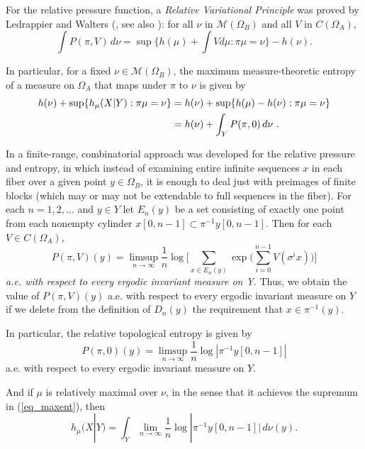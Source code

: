 \documentclass{kepart2010}
\theoremstyle{plain}
\theoremstyle{definition}
\theoremstyle{remark}
\theoremstyle{definition}
\numberwithin{equation}{section}
\begin{document}
For the relative pressure function, a {\em Relative Variational
Principle} was proved by Ledrappier and Walters
(\cite{LedrappierWalters1977}, see also
\cite{DownarowiczSerafin2002}):
 for all
$\nu$ in ${{\mathcal M}}(\Omega_B)$ and all $V$ in $C(\Omega_A)$,
 \begin{equation}
 \int\!P(\pi, V) \, d \nu = \sup\limits \Big\{ h(\mu) + \int\!V d
\mu : \pi\mu =\nu \Big\} - h(\nu). \end{equation}

In particular, for a fixed $\nu \in {{\mathcal M}}(\Omega_B)$, the maximum
measure-theoretic entropy of a measure on $\Omega_A$ that maps under
$\pi$ to $\nu$ is given by
\begin{align}\label{eq_maxent}
h(\nu ) + \sup \{h_{\mu}(X|Y) :\pi\mu =\nu\}
&= h(\nu ) +\sup \{h(\mu)- h(\nu): \pi\mu =\nu\} \\
\notag  &= h(\nu ) +\int_Y P(\pi ,0)\,  d \nu \ .
\end{align}

In \cite{PetersenShin2005} a finite-range, combinatorial approach
was developed for the relative pressure and entropy, in which
instead of examining entire infinite sequences $x$ in each fiber
over a given point $y \in \Omega_B$, it is enough to deal just with
preimages of finite blocks (which may or may not be extendable to
full sequences in the fiber). For each $n = 1, 2, \dots$ and $y \in
Y$ let $E_n (y)$ be a set consisting of exactly one point from each
nonempty cylinder $x[0,n-1] \subset \pi^{-1} y[0,n-1]$.
\medskip
Then for each $V \in C(\Omega_A)$,
 \begin{equation} P(\pi,V) (y) = \limsup_{n
 \rightarrow \infty} \frac{1}{n} \log \bigg[ \sum_{x \in E_n (y)}
 \exp \Big( \sum_{i=0}^{n-1} V (\sigma^i x) \Big) \bigg]
 \end{equation}
 {\em a.e. with respect to every
ergodic invariant measure on Y}. Thus, we obtain the
value of $P(\pi,V) (y)$ a.e. with respect to every
ergodic invariant measure
on $Y$ if we {delete from the definition of $D_n (y)$ the
requirement that $x \in \pi^{-1} (y)$}.

In particular, the relative topological entropy is given by
 \begin{equation} P(\pi ,0)(y)=\limsup_{n \to \infty}\frac{1}{n}\log
 |\pi^{-1}y[0,n-1]|
 \end{equation}
 a.e. with respect to every ergodic
invariant measure on $Y$.

And if $\mu$ is relatively maximal over $\nu$, in the sense that it
achieves the supremum in (\ref{eq_maxent}), then
 \begin{equation} h_\mu(X|Y)=\int_Y \lim_{n \to \infty}\frac{1}{n}
 \log |\pi^{-1}y[0,n-1]|\, d\nu (y) .
 \end{equation}
\end{document}
